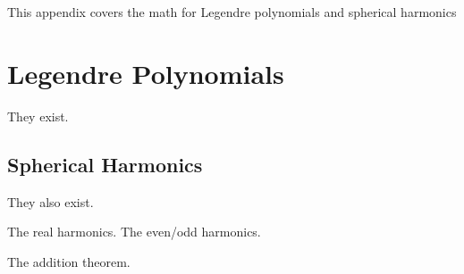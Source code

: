 


This appendix covers the math for Legendre polynomials and spherical harmonics

\section{Legendre Polynomials}\label{appdx:leg}

They exist.

\subsection{Spherical Harmonics}

They also exist.

The real harmonics. The even/odd harmonics.

The addition theorem.

\endinput
